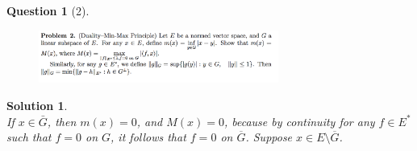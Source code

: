 \documentclass{article} %
\theoremstyle{quest}
\newtheorem*{question}{Question}
\newtheorem*{solution}{Solution}
\begin{document}
\newpage

\begin{question}[2]
\hfill
\begin{figure}[h!]
  \centering
    \includegraphics[width=0.7\textwidth]{funcA-h-e1-p2.png}
\end{figure}
\end{question}
\begin{solution} \hfill \\
If $x \in \bar{G}$, then $m(x) = 0$,
and $M(x) = 0$, because by continuity for any $f \in E^*$ such that $f = 0$
on $G$, it follows that $f = 0$ on $\overline{G}$.
Suppose $x \in  E \setminus \overline{G}$.  


\bigskip


\end{solution}

\newpage
\end{document}
